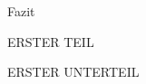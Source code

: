 \documentclass[pdftex, a4paper,11pt, twoside, ngerman]{report}
\begin{document}
  \begin{chapter}{Fazit}
    \label{chp:Fazit}
    
    
    
    \begin{section}{ERSTER TEIL}
      \label{chp:Fazit:sec:ERSTERTEIL}
      
      
      
      \begin{subsection}{ERSTER UNTERTEIL}
	\label{chp:Fazit:sec:ERSTERTEIL:subsec:UNTERTEIL}
       
       
       
      \end{subsection}
      
      
    \end{section}
    
  \end{chapter}
  
\end{document}
